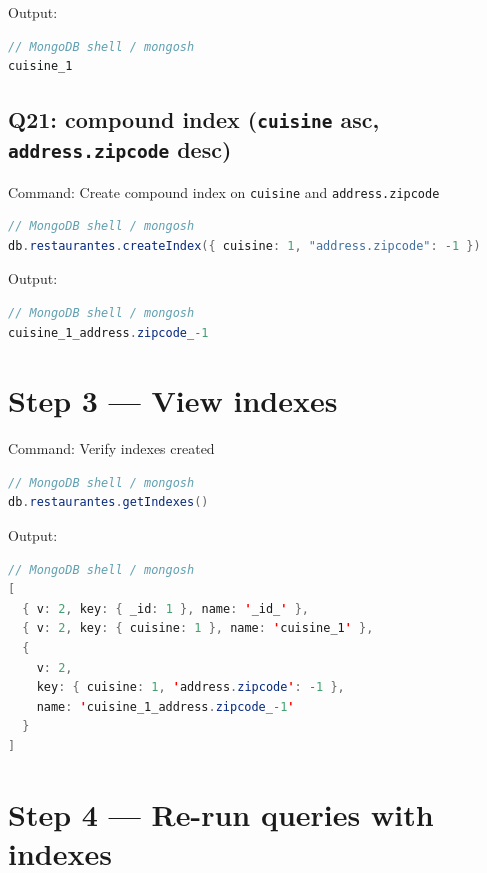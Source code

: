 \documentclass[11pt, letterpaper]{article}
\begin{document}
\begin{labstep}{Output:}
\begin{lstlisting}[language=Java]
// MongoDB shell / mongosh
cuisine_1
\end{lstlisting}
\end{labstep}

\subsection{Q21: compound index (\texttt{cuisine} asc, \texttt{address.zipcode} desc)}

\begin{labstep}{Command: Create compound index on \texttt{cuisine} and \texttt{address.zipcode}}
\begin{lstlisting}[language=Java]
// MongoDB shell / mongosh
db.restaurantes.createIndex({ cuisine: 1, "address.zipcode": -1 })
\end{lstlisting}
\end{labstep}

\begin{labstep}{Output:}
\begin{lstlisting}[language=Java]
// MongoDB shell / mongosh
cuisine_1_address.zipcode_-1
\end{lstlisting}
\end{labstep}

\section{Step 3 — View indexes}

\begin{labstep}{Command: Verify indexes created}
\begin{lstlisting}[language=Java]
// MongoDB shell / mongosh
db.restaurantes.getIndexes()
\end{lstlisting}
\end{labstep}

\begin{labstep}{Output:}
\begin{lstlisting}[language=Java]
// MongoDB shell / mongosh
[
  { v: 2, key: { _id: 1 }, name: '_id_' },
  { v: 2, key: { cuisine: 1 }, name: 'cuisine_1' },
  {
    v: 2,
    key: { cuisine: 1, 'address.zipcode': -1 },
    name: 'cuisine_1_address.zipcode_-1'
  }
]
\end{lstlisting}
\end{labstep}

\section{Step 4 — Re-run queries with indexes}
\end{document}
